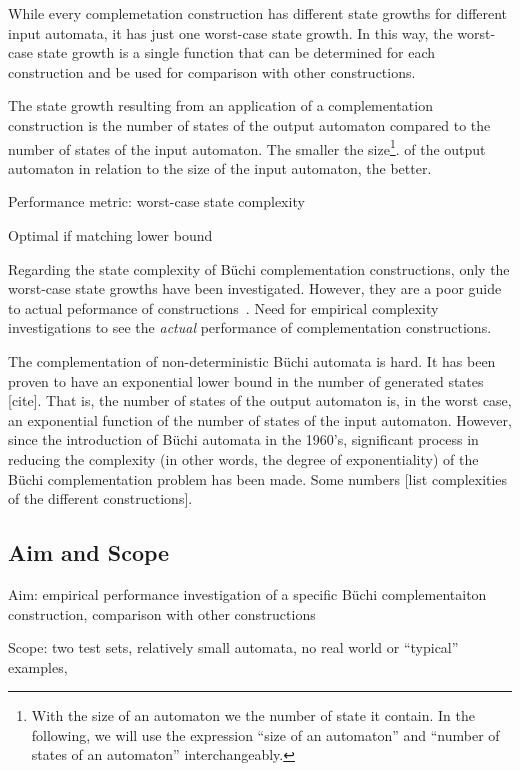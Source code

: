 While every complemetation construction has different state growths for different input automata, it has just one worst-case state growth. In this way, the worst-case state growth is a single function that can be determined for each construction and be used for comparison with other constructions. 


The state growth resulting from an application of a complementation construction is the number of states of the output automaton compared to the number of states of the input automaton. The smaller the size\footnote{With the size of an automaton we the number of state it contain. In the following, we will use the expression ``size of an automaton'' and ``number of states of an automaton'' interchangeably.}. of the output automaton in relation to the size of the input automaton, the better. 



Performance metric: worst-case state complexity

Optimal if matching lower bound




Regarding the state complexity of Büchi complementation constructions, only the worst-case state growths have been investigated. However, they are a poor guide to actual peformance of constructions~\cite{2011_tsai}. Need for empirical complexity investigations to see the \textit{actual} performance of complementation constructions.

The complementation of non-deterministic Büchi automata is hard. It has been proven to have an exponential lower bound in the number of generated states [cite]. That is, the number of states of the output automaton is, in the worst case, an exponential function of the number of states of the input automaton. However, since the introduction of Büchi automata in the 1960's, significant process in reducing the complexity (in other words, the degree of exponentiality) of the Büchi complementation problem has been made. Some numbers [list complexities of the different constructions].

\subsection{Aim and Scope}

Aim: empirical performance investigation of a specific Büchi complementaiton construction, comparison with other constructions

Scope: two test sets, relatively small automata, no real world or ``typical'' examples,

